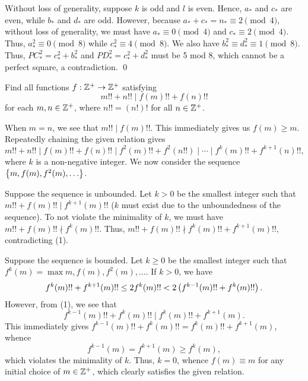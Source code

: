 \begin{solution*}
     Without loss of generality, suppose $k$ is odd and $l$ is even. Hence, $a_\ast$ and $c_\ast$ are even, while $b_\ast$ and $d_\ast$ are odd. However, because $a_\ast + c_\ast = n_\ast \equiv 2 \pmod{4}$, without loss of generality, we must have $a_\ast \equiv 0 \pmod{4}$ and $c_\ast \equiv 2 \pmod{4}$. Thus, $a_\ast^2 \equiv 0 \pmod{8}$ while $c_\ast^2 \equiv 4 \pmod{8}$. We also have $b_\ast^2 \equiv d_\ast^2 \equiv 1 \pmod{8}$. Thus, $PC_\ast^2 = c_\ast^2 + b_\ast^2$ and $PD_\ast^2 = c_\ast^2 + d_\ast^2$ must be 5 mod 8, which cannot be a perfect square, a contradiction. \qed
\end{solution*}

\begin{question}[${f(m) \equiv m}$]\label{Q::2022-O-2-3}
    Find all functions $f : \mathbb{Z}^+ \to \mathbb{Z}^+$ satisfying \[m!! + n!! \mid f(m)!! + f(n)!!\] for each $m, n \in \mathbb{Z}^+$, where $n!! = (n!)!$ for all $n \in \mathbb{Z}^+$.
\end{question}
\begin{solution*}
    When $m = n$, we see that $m!! \mid f(m)!!$. This immediately gives us $f(m) \geq m$. Repeatedly chaining the given relation gives \[m!! + n!! \mid f(m)!! + f(n)!! \mid f^2(m)!! + f^2(n!!) \mid \cdots \mid f^k(m)!! + f^{k+1}(n)!!, \tag{1}\] where $k$ is a non-negative integer. We now consider the sequence $\left\lbrace m, f(m), f^2(m), \ldots \right\rbrace$.

     Suppose the sequence is unbounded. Let $k > 0$ be the smallest integer such that $m!! + f(m)!! \mid f^{k+1}(m)!!$ ($k$ must exist due to the unboundedness of the sequence). To not violate the minimality of $k$, we must have $m!! + f(m)!! \nmid f^k(m)!!$. Thus, $m!! + f(m)!! \nmid f^k(m)!! + f^{k+1}(m)!!$, contradicting (1).

     Suppose the sequence is bounded. Let $k \geq 0$ be the smallest integer such that $f^k(m) = \max{m, f(m), f^2(m), \ldots}$. If $k > 0$, we have \[f^k(m)!! + f^{k+1}(m)!! \leq 2f^k(m)!! < 2\left( f^{k-1}(m)!! + f^k(m)!! \right).\] However, from (1), we see that \[f^{k-1}(m)!! + f^k(m)!! \mid f^k(m)!! + f^{k+1}(m).\] This immediately gives $f^{k-1}(m)!! + f^k(m)!! = f^k(m)!! + f^{k+1}(m)$, whence \[f^{k-1}(m) = f^{k+1}(m) \geq f^k(m),\] which violates the minimality of $k$. Thus, $k =0$, whence $f(m) \equiv m$ for any initial choice of $m \in \mathbb{Z}^+$, which clearly satisfies the given relation.
\end{solution*}

